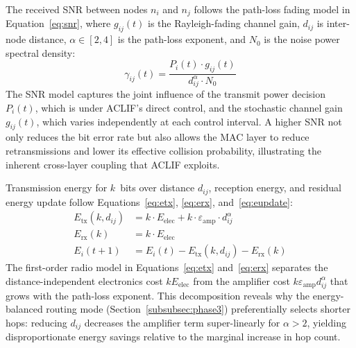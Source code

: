 \documentclass[a4paper]{cas-dc}
\numberwithin{equation}{section}
\begin{document}
The received SNR between nodes $n_i$ and $n_j$ follows the path-loss fading model in Equation~\ref{eq:snr}, where $g_{ij}(t)$ is the Rayleigh-fading channel gain, $d_{ij}$ is inter-node distance, $\alpha\in[2,4]$ is the path-loss exponent, and $N_0$ is the noise power spectral density:
\begin{equation}
\label{eq:snr}
\gamma_{ij}(t) = \frac{P_i(t)\cdot g_{ij}(t)}{d_{ij}^{\alpha}\cdot N_0}
\end{equation}
The SNR model captures the joint influence of the transmit power decision $P_i(t)$, which is under ACLIF's direct control, and the stochastic channel gain $g_{ij}(t)$, which varies independently at each control interval. A higher SNR not only reduces the bit error rate but also allows the MAC layer to reduce retransmissions and lower its effective collision probability, illustrating the inherent cross-layer coupling that ACLIF exploits.

Transmission energy for $k$~bits over distance $d_{ij}$, reception energy, and residual energy update follow Equations~\ref{eq:etx}, \ref{eq:erx}, and~\ref{eq:eupdate}:
\begin{align}
\label{eq:etx}
E_{\text{tx}}(k,d_{ij}) &= k\cdot E_{\text{elec}} + k\cdot\varepsilon_{\text{amp}}\cdot d_{ij}^{\alpha} \\
\label{eq:erx}
E_{\text{rx}}(k)        &= k\cdot E_{\text{elec}} \\
\label{eq:eupdate}
E_i(t{+}1)              &= E_i(t) - E_{\text{tx}}(k,d_{ij}) - E_{\text{rx}}(k)
\end{align}
The first-order radio model in Equations~\ref{eq:etx} and~\ref{eq:erx} separates the distance-independent electronics cost $k E_{\text{elec}}$ from the amplifier cost $k \varepsilon_{\text{amp}} d_{ij}^\alpha$ that grows with the path-loss exponent. This decomposition reveals why the energy-balanced routing mode (Section~\ref{subsubsec:phase3}) preferentially selects shorter hops: reducing $d_{ij}$ decreases the amplifier term super-linearly for $\alpha > 2$, yielding disproportionate energy savings relative to the marginal increase in hop count.
\end{document}
